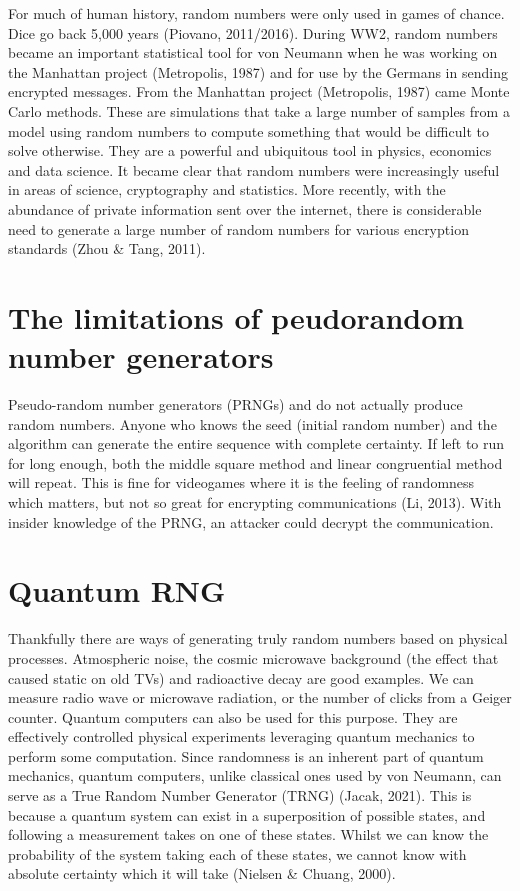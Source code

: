 \documentclass{book}
\begin{document}
For much of human history, random numbers were only used in games of chance. Dice go back 5,000 years (Piovano, 2011/2016). During WW2, random numbers became an important statistical tool for von Neumann when he was working on the Manhattan project (Metropolis, 1987) and for use by the Germans in sending encrypted messages. 
From the Manhattan project (Metropolis, 1987) came Monte Carlo methods. These are simulations that take a large number of samples from a model using random numbers to compute something that would be difficult to solve otherwise. They are a powerful and ubiquitous tool in physics, economics and data science. It became clear that random numbers were increasingly useful in areas of science, cryptography and statistics. More recently, with the abundance of private information sent over the internet, there is considerable need to generate a large number of random numbers for various encryption standards (Zhou \& Tang, 2011).

\section{The limitations of peudorandom number generators} 


Pseudo-random number generators (PRNGs) and do not actually produce random numbers. Anyone who knows the seed (initial random number) and the algorithm can generate the entire sequence with complete certainty. If left to run for long enough, both the middle square method and linear congruential method will repeat. This is fine for videogames where it is the feeling of randomness which matters, but not so great for encrypting communications (Li, 2013). With insider knowledge of the PRNG, an attacker could decrypt the communication.

\section{Quantum RNG}

Thankfully there are ways of generating truly random numbers based on physical processes. Atmospheric noise, the cosmic microwave background (the effect that caused static on old TVs) and radioactive decay are good examples. We can measure radio wave or microwave radiation, or the number of clicks from a Geiger counter.
Quantum computers can also be used for this purpose. They are effectively controlled physical experiments leveraging quantum mechanics to perform some computation. Since randomness is an inherent part of quantum mechanics, quantum computers, unlike classical ones used by von Neumann, can serve as a True Random Number Generator (TRNG) (Jacak, 2021). This is because a quantum system can exist in a superposition of possible states, and following a measurement takes on one of these states. Whilst we can know the probability of the system taking each of these states, we cannot know with absolute certainty which it will take (Nielsen \& Chuang, 2000).
\end{document}
